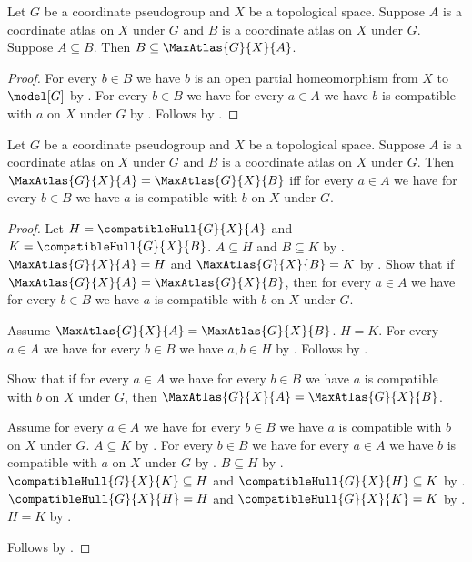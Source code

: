 \begin{theorem}\label{atlas_extension_subset_max_atlas}
    Let $G$ be a coordinate pseudogroup and $X$ be a topological space.
    Suppose $A$ is a coordinate atlas on $X$ under $G$ and
        $B$ is a coordinate atlas on $X$ under $G$.
    Suppose $A\subseteq B$.
    Then $B\subseteq\MaxAtlas{G}{X}{A}$.
\end{theorem}
\begin{proof}
    For every $b\in B$ we have $b$ is an open partial homeomorphism from
        $X$ to $\model[G]$ by .
    For every $b\in B$ we have for every $a\in A$ we have
        $b$ is compatible with $a$ on $X$ under $G$ by
        .
    Follows by .
\end{proof}

\begin{theorem}\label{max_atlas_equality_iff}
    Let $G$ be a coordinate pseudogroup and $X$ be a topological space.
    Suppose $A$ is a coordinate atlas on $X$ under $G$ and
        $B$ is a coordinate atlas on $X$ under $G$.
    Then $\MaxAtlas{G}{X}{A}=\MaxAtlas{G}{X}{B}$ iff
        for every $a\in A$ we have for every $b\in B$ we have
            $a$ is compatible with $b$ on $X$ under $G$.
\end{theorem}
\begin{proof}
    Let $H=\compatibleHull{G}{X}{A}$ and $K=\compatibleHull{G}{X}{B}$.
    $A\subseteq H$ and $B\subseteq K$ by .
    $\MaxAtlas{G}{X}{A}=H$ and $\MaxAtlas{G}{X}{B}=K$ by .
    Show that if $\MaxAtlas{G}{X}{A}=\MaxAtlas{G}{X}{B}$, then
        for every $a\in A$ we have for every $b\in B$ we have
            $a$ is compatible with $b$ on $X$ under $G$.
    \begin{subproof}
        Assume $\MaxAtlas{G}{X}{A}=\MaxAtlas{G}{X}{B}$.
        $H=K$.
        For every $a\in A$ we have for every $b\in B$ we have $a,b\in H$ by
            .
        Follows by .
    \end{subproof}
    Show that if for every $a\in A$ we have for every $b\in B$ we have
        $a$ is compatible with $b$ on $X$ under $G$,
        then $\MaxAtlas{G}{X}{A}=\MaxAtlas{G}{X}{B}$.
    \begin{subproof}
        Assume for every $a\in A$ we have for every $b\in B$ we have
            $a$ is compatible with $b$ on $X$ under $G$.
        $A\subseteq K$ by .
        For every $b\in B$ we have for every $a\in A$ we have
            $b$ is compatible with $a$ on $X$ under $G$ by
            .
        $B\subseteq H$ by .
        $\compatibleHull{G}{X}{K}\subseteq H$ and
            $\compatibleHull{G}{X}{H}\subseteq K$ by
            .
        $\compatibleHull{G}{X}{H}=H$ and $\compatibleHull{G}{X}{K}=K$ by
            .
        $H=K$ by .
    \end{subproof}
    Follows by \auto.
\end{proof}


